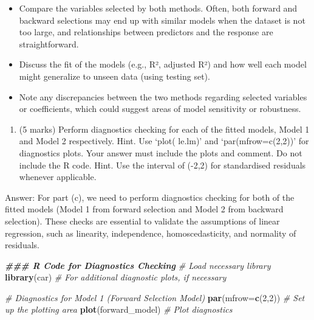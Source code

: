\documentclass[
]{article}
\newenvironment{Shaded}{\begin{snugshade}}{\end{snugshade}}
\newcommand{\AttributeTok}[1]{\textcolor[rgb]{0.13,0.29,0.53}{#1}}
\newcommand{\CommentTok}[1]{\textcolor[rgb]{0.56,0.35,0.01}{\textit{#1}}}
\newcommand{\DecValTok}[1]{\textcolor[rgb]{0.00,0.00,0.81}{#1}}
\newcommand{\DocumentationTok}[1]{\textcolor[rgb]{0.56,0.35,0.01}{\textbf{\textit{#1}}}}
\newcommand{\FunctionTok}[1]{\textcolor[rgb]{0.13,0.29,0.53}{\textbf{#1}}}
\newcommand{\NormalTok}[1]{#1}
\providecommand{\tightlist}{%
  \setlength{\itemsep}{0pt}\setlength{\parskip}{0pt}}
\begin{document}
\begin{itemize}
\tightlist
\item
  Compare the variables selected by both methods. Often, both forward
  and backward selections may end up with similar models when the
  dataset is not too large, and relationships between predictors and the
  response are straightforward.
\item
  Discuss the fit of the models (e.g., R², adjusted R²) and how well
  each model might generalize to unseen data (using testing set).
\item
  Note any discrepancies between the two methods regarding selected
  variables or coefficients, which could suggest areas of model
  sensitivity or robustness.
\end{itemize}

\begin{enumerate}
\def\labelenumi{(\alph{enumi})}
\setcounter{enumi}{2}
\tightlist
\item
  (5 marks) Perform diagnostics checking for each of the fitted models,
  Model 1 and Model 2 respectively. Hint. Use `plot( le.lm)' and
  `par(mfrow=c(2,2))' for diagnostics plots. Your answer must include
  the plots and comment. Do not include the R code. Hint. Use the
  interval of (-2,2) for standardised residuals whenever applicable.
\end{enumerate}

Answer: For part (c), we need to perform diagnostics checking for both
of the fitted models (Model 1 from forward selection and Model 2 from
backward selection). These checks are essential to validate the
assumptions of linear regression, such as linearity, independence,
homoscedasticity, and normality of residuals.

\begin{Shaded}
\begin{Highlighting}[]
\DocumentationTok{\#\#\# R Code for Diagnostics Checking}
\CommentTok{\# Load necessary library}
\FunctionTok{library}\NormalTok{(car)  }\CommentTok{\# For additional diagnostic plots, if necessary}

\CommentTok{\# Diagnostics for Model 1 (Forward Selection Model)}
\FunctionTok{par}\NormalTok{(}\AttributeTok{mfrow=}\FunctionTok{c}\NormalTok{(}\DecValTok{2}\NormalTok{,}\DecValTok{2}\NormalTok{))  }\CommentTok{\# Set up the plotting area}
\FunctionTok{plot}\NormalTok{(forward\_model)  }\CommentTok{\# Plot diagnostics}
\end{Highlighting}
\end{Shaded}
\end{document}
